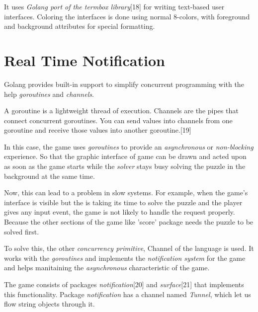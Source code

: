 \documentclass[a4paper]{article}
\begin{document}
\textrm{\normalsize{It uses \textit{Golang port of the termbox library}[18] for writing text-based user interfaces. Coloring the
interfaces is done using normal 8-colors, with foreground and background attributes for special
formatting.\\}}

\section{Real Time Notification}

\textrm{\normalsize{Golang provides built-in support to simplify concurrent programming with the help \textit{goroutines} and
\textit{channels}.\\}}

\textrm{\normalsize{A goroutine is a lightweight thread of execution. Channels are the pipes that connect concurrent
goroutines. You can send values into channels from one goroutine and receive those values into
another goroutine.[19]\\}}

\textrm{\normalsize{In this case, the game uses \textit{goroutines} to provide an \textit{asynchronous} or \textit{non-blocking} experience. So
that the graphic interface of game can be drawn and acted upon as soon as the game starts while
the \textit{solver} stays busy solving the puzzle in the background at the same time.\\}}


\textrm{\normalsize{Now, this can lead to a problem in slow systems. For example, when the game's interface is visible
but the  is taking its time to solve the puzzle and the player gives any input event, the game
is not likely to handle the request properly. Because the other sections of the game like 'score'
package needs the puzzle to be solved first.\\}}

\textrm{\normalsize{To solve this, the other \textit{concurrency primitive}, Channel of the language is used. It works with the
\textit{goroutines} and implements the \textit{notification system} for the game and helps manitaining the
\textit{asynchronous} characteristic of the game.\\}}

\textrm{\normalsize{The game consists of packages \textit{notification}[20] and \textit{surface}[21] that implements this functionality.
Package \textit{notification} has a channel named \textit{Tunnel}, which let us flow string objects through it.\\}}
\end{document}
